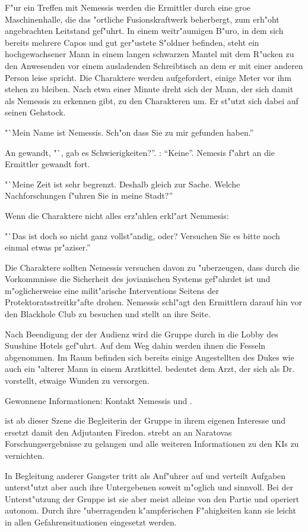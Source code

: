 
F"ur ein Treffen mit Nemessis werden die Ermittler durch eine gro\3e Maschinenhalle, die das "ortliche Fusionskraftwerk beherbergt, zum erh"oht angebrachten Leitstand gef"uhrt. In einem weitr"aumigen B"uro, in dem sich bereits mehrere Capos und gut ger"ustete S"oldner befinden, steht ein hochgewachsener Mann in einem langen schwarzen Mantel mit dem R"ucken zu den Anwesenden vor einem ausladenden Schreibtisch an dem er mit einer anderen Person leise spricht. Die Charaktere werden aufgefordert, einige Meter vor ihm stehen zu bleiben. Nach etwa einer Minute dreht sich der Mann, der sich damit als Nemessis zu erkennen gibt, zu den Charakteren um. Er st"utzt sich dabei auf seinen Gehstock.

"`Mein Name ist Nemessis. Sch"on dass Sie zu mir gefunden haben.'' 

An \xl{} gewandt, "`\xlsn{}, gab es Schwierigkeiten?''. \xl{}:  "`Keine"'. Nemesis f"ahrt an die Ermittler gewandt fort. 

"`Meine Zeit ist sehr begrenzt. Deshalb gleich zur Sache. Welche Nachforschungen f"uhren Sie in meine Stadt?''

Wenn die Charaktere nicht alles erz"ahlen erkl"art Nemmesis:

"`Das ist doch so nicht ganz vollst"andig, oder? Versuchen Sie es bitte noch einmal etwas pr"aziser.''

Die Charaktere sollten Nemessis versuchen davon zu "uberzeugen, dass durch die Vorkommnisse die Sicherheit des jovianischen Systems gef"ahrdet ist und m"oglicherweise eine milit"arische Interventions Seitens der Protektoratsstreitkr"afte drohen. Nemessis schl"agt den Ermittlern darauf hin vor den Blackhole Club zu besuchen und stellt \xl{} an ihre Seite.

Nach Beendigung der der Audienz wird die Gruppe durch \xlsn{} in die Lobby des Suushine Hotels gef"uhrt. Auf dem Weg dahin werden ihnen die Fesseln abgenommen. Im Raum befinden sich bereits einige Angestellten des Dukes wie auch ein "alterer Mann in einem Arztkittel. \xlsn{} bedeutet dem Arzt, der sich als Dr.~  vorstellt, etwaige Wunden zu versorgen.

\begin{remarks}
	Gewonnene Informationen: Kontakt Nemessis und \xl{}.

	\xl{} ist ab dieser Szene die Begleiterin der Gruppe in ihrem eigenen Interesse und ersetzt damit den Adjutanten Firedon. \xl{} strebt an an Naratovas Forschungsergebnisse zu gelangen und alle weiteren Informationen zu den KIs zu vernichten.

	In Begleitung anderer Gangster tritt \xl{} als Anf"uhrer auf und verteilt Aufgaben unterst"utzt aber auch ihre Untergebenen soweit m"oglich und sinnvoll. Bei der Unterst"utzung der Gruppe ist sie aber meist alleine von den Partie und operiert autonom. Durch ihre "uberragenden k"ampferischen F"ahigkeiten kann sie leicht in allen Gefahrensituationen eingesetzt werden.
\end{remarks}


